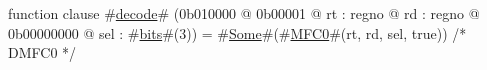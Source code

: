 function clause #\hyperref[zdecode]{decode}# (0b010000 @ 0b00001 @ rt : regno @ rd : regno @ 0b00000000 @ sel : #\hyperref[zbits]{bits}#(3)) =
  #\hyperref[zSome]{Some}#(#\hyperref[zMFCzero]{MFC0}#(rt, rd, sel, true))  /* DMFC0 */

